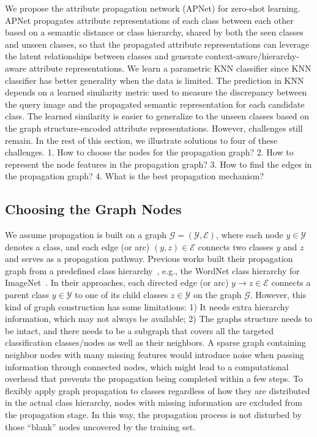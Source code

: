 \documentclass[letterpaper]{article}
\def\gG{{\mathcal{G}}}
\begin{document}
We propose the attribute propagation network (APNet) for zero-shot learning. APNet propagates attribute representations of each class between each other based on a semantic distance or class hierarchy, shared by both the seen classes and unseen classes, so that the propagated attribute representations can leverage the latent relationships between classes and generate context-aware/hierarchy-aware attribute representations. We learn a parametric KNN classifier since KNN classifier has better generality when the data is limited.
The prediction in KNN depends on a learned similarity metric used to measure the discrepancy between the query image and the propagated semantic representation for each candidate class.
The learned similarity is easier to generalize to the unseen classes based on the graph structure-encoded attribute representations.
However, challenges still remain. In the rest of this section, we illustrate solutions to four of these challenges.
1. How to choose the nodes for the propagation graph?
2. How to represent the node features in the propagation graph?
3. How to find the edges in the propagation graph?
4. What is the best propagation mechanism?






\subsection{Choosing the Graph Nodes}

We assume propagation is built on a graph $\gG=(\mathcal Y, \mathcal E)$, where each node $y\in \mathcal Y$ denotes a class, and each edge (or arc) $(y,z)\in\mathcal E$ connects two classes $y$ and $z$ and serves as a propagation pathway. Previous works built their propagation graph from a predefined class hierarchy~\cite{wang2018zero,kampffmeyer2019rethinking}, e.g., the WordNet class hierarchy for ImageNet~\cite{imagenet}. In their approaches, each directed edge (or arc) $y\rightarrow z\in \mathcal E$ connects a parent class $y\in\mathcal Y$ to one of its child classes $z\in\mathcal Y$ on the graph $\gG$. However, this kind of graph construction has some limitations: 1) It needs extra hierarchy information, which may not always be available; 2) The graphs structure needs to be intact, and there needs to be a subgraph that covers all the targeted classification classes/nodes as well as their neighbors. A sparse graph containing neighbor nodes with many missing features would introduce noise when passing information through connected nodes, which might lead to a computational overhead that prevents the propagation being completed within a few steps.
To flexibly apply graph propagation to classes regardless of how they are distributed in the actual class hierarchy, nodes with missing information are excluded from the propagation stage. In this way, the propagation process is not disturbed by those ``blank'' nodes uncovered by the training set.
\end{document}
